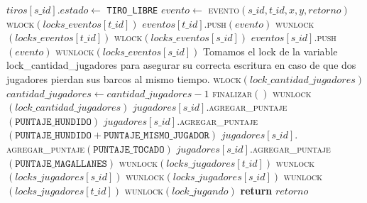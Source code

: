 \documentclass[a4paper,10pt,twoside]{article}
\newenvironment{pseudo}[1][]{%
    \vspace{0.5em}%
    \begin{algorithmic}%
}
{%
    \end{algorithmic}%
    \vspace{0.5em}%
}
\newcommand{\Fn}[2]{\textsc{#1}$(#2)$}
\newcommand{\PReturn}[1]{\textbf{return} $#1$}
\begin{document}
\begin{pseudo}
                \State
                \State $tiros[s\_id].estado \leftarrow$ \texttt{TIRO\_LIBRE}
                \State $evento \leftarrow$ \Fn{evento}{s\_id, t\_id, x, y, retorno}
                \State
                \State \Fn{wlock}{locks\_eventos[t\_id]} 
                \State $eventos[t\_id].$\Fn{push}{evento}
                \State \Fn{wunlock}{locks\_eventos[t\_id]}
                \State
                \State \Fn{wlock}{locks\_eventos[s\_id]} 
                \State $eventos[s\_id].$\Fn{push}{evento}
                \State \Fn{wunlock}{locks\_eventos[s\_id]}
                \State
                    \State 
                    \State Tomamos el lock de la variable lock\_cantidad\_jugadores para asegurar su correcta escritura en caso de que dos jugadores pierdan sus barcos al mismo tiempo.
                    \State 
                    \State \Fn{wlock}{lock\_cantidad\_jugadores}
                    \State $cantidad\_jugadores \leftarrow cantidad\_jugadores - 1$
                        \State \Fn{finalizar}{}
                    \EndIf
                    \State \Fn{wunlock}{lock\_cantidad\_jugadores}
                \EndIf
            \EndIf
                \State $jugadores[s\_id].$\Fn{agregar\_puntaje}{\texttt{PUNTAJE\_HUNDIDO}}
                \State $jugadores[s\_id].$\Fn{agregar\_puntaje}{\texttt{PUNTAJE\_HUNDIDO} + \texttt{PUNTAJE\_MISMO\_JUGADOR}}
                \State $jugadores[s\_id].$\Fn{agregar\_puntaje}{\texttt{PUNTAJE\_TOCADO}}
                \State $jugadores[s\_id].$\Fn{agregar\_puntaje}{\texttt{PUNTAJE\_MAGALLANES}}
            \EndIf
            \State
                \State \Fn{wunlock}{locks\_jugadores[t\_id]}
                \State \Fn{wunlock}{locks\_jugadores[s\_id]}
            \Else
                    \State \Fn{wunlock}{locks\_jugadores[s\_id]}
                \EndIf
                \State \Fn{wunlock}{locks\_jugadores[t\_id]}
            \EndIf
        \EndIf
        \State
        \State \Fn{wunlock}{lock\_jugando}
        \State
        \State \PReturn{retorno}
    \EndProcedure
\end{pseudo}
\end{document}
